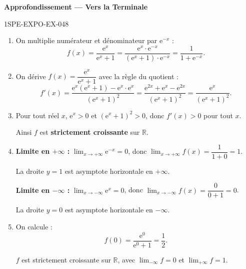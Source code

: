 \begin{center}\textbf{Approfondissement — Vers la Terminale}\end{center}
\begin{corrige}{1SPE-EXPO-EX-048}
\begin{enumerate}
\item On multiplie numérateur et dénominateur par $\mathrm{e}^{-x}$ :
\[f(x) = \dfrac{\mathrm{e}^x}{\mathrm{e}^x + 1} = \dfrac{\mathrm{e}^x \cdot \mathrm{e}^{-x}}{(\mathrm{e}^x + 1)\cdot \mathrm{e}^{-x}} = \dfrac{1}{1 + \mathrm{e}^{-x}}.\]

\item On dérive $f(x) = \dfrac{\mathrm{e}^x}{\mathrm{e}^x + 1}$ avec la règle du quotient :
\[f'(x) = \dfrac{\mathrm{e}^x(\mathrm{e}^x + 1) - \mathrm{e}^x \cdot \mathrm{e}^x}{(\mathrm{e}^x + 1)^2} = \dfrac{\mathrm{e}^{2x} + \mathrm{e}^x - \mathrm{e}^{2x}}{(\mathrm{e}^x + 1)^2} = \dfrac{\mathrm{e}^x}{(\mathrm{e}^x + 1)^2}.\]

\item Pour tout réel $x$, $\mathrm{e}^x > 0$ et $(\mathrm{e}^x + 1)^2 > 0$, donc $f'(x) > 0$ pour tout $x$.

Ainsi $f$ est \textbf{strictement croissante} sur $\mathbb{R}$.

\item \textbf{Limite en $+\infty$ :} $\lim_{x \to +\infty} \mathrm{e}^{-x} = 0$, donc $\lim_{x \to +\infty} f(x) = \dfrac{1}{1 + 0} = 1$.

La droite $y = 1$ est asymptote horizontale en $+\infty$.

\textbf{Limite en $-\infty$ :} $\lim_{x \to -\infty} \mathrm{e}^{x} = 0$, donc $\lim_{x \to -\infty} f(x) = \dfrac{0}{0 + 1} = 0$.

La droite $y = 0$ est asymptote horizontale en $-\infty$.

\item On calcule :
\[f(0) = \dfrac{\mathrm{e}^0}{\mathrm{e}^0 + 1} = \dfrac{1}{2}.\]

$f$ est strictement croissante sur $\mathbb{R}$, avec $\lim_{-\infty} f = 0$ et $\lim_{+\infty} f = 1$.
\end{enumerate}
\end{corrige}

